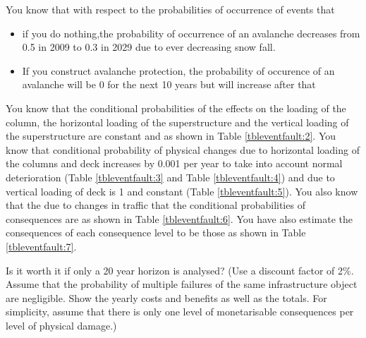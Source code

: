 You know that with respect to the probabilities of occurrence of events that
\begin{itemize}
\item if you do nothing,the probability of occurrence of an avalanche decreases from
0.5 in 2009 to 0.3 in 2029 due to ever decreasing snow fall.
\item If you construct avalanche protection, the probability of occurence of an
avalanche will be 0 for the next 10 years but will increase after that
\end{itemize}
You know that the conditional probabilities of the effects on the loading of the
column, the horizontal loading of the superstructure and the vertical loading of
the superstructure are constant and as shown in Table \ref{tbleventfault:2}. You know that
conditional probability of physical changes due to horizontal loading of the
columns and deck increases by 0.001 per year to take into account normal
deterioration (Table \ref{tbleventfault:3} and Table \ref{tbleventfault:4}) and due to vertical
loading of deck is 1 and constant (Table \ref{tbleventfault:5}). You also know that the due
to changes in traffic that the conditional probabilities of consequences are as
shown in Table \ref{tbleventfault:6}. You have also estimate the consequences of each
consequence level to be those as shown in Table \ref{tbleventfault:7}.

Is it worth it if only a 20 year horizon is analysed?  (Use a discount factor of
2\%. Assume that the probability of multiple failures of the same infrastructure
object are negligible. Show the yearly costs and benefits as well as the totals.
For simplicity, assume that there is only one level of monetarisable consequences
per level of physical damage.)

